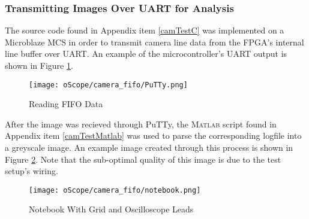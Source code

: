 \subsubsection{Transmitting Images Over UART for Analysis}
The source code found in Appendix item \ref{camTestC} was implemented on a Microblaze MCS in order to transmit camera line data from the FPGA's internal line buffer over UART. An example of the microcontroller's UART output is shown in Figure \ref{PuTTYfifoData}. 
\begin{figure}[H]
	\centerline{\texttt{[image: oScope/camera\_fifo/PuTTy.png]}}
	\caption{Reading FIFO Data}
	\label{PuTTYfifoData}
\end{figure}

\par
After the image was recieved through PuTTy, the \textsc{Matlab} script found in Appendix item \ref{camTestMatlab} was used to parse the corresponding logfile into a greyscale image. An example image created through this process is shown in Figure \ref{notebookImage}. Note that the sub-optimal quality of this image is due to the test setup's wiring. 
\begin{figure}[H]
	\centerline{\texttt{[image: oScope/camera\_fifo/notebook.png]}}
	\caption{Notebook With Grid and Oscilloscope Leads}
	\label{notebookImage}
\end{figure}

